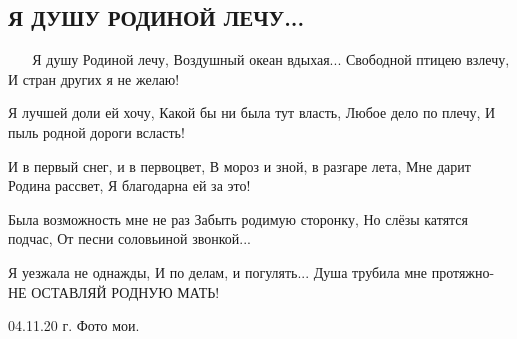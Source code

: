  
 
 

\subsection{Я ДУШУ РОДИНОЙ ЛЕЧУ...}
\label{sec:04_11_2020.fb.taisia_vakulenko.1.rodina}

🍂🌿🍁🌿🍁
Я душу Родиной лечу,
Воздушный океан вдыхая...
Свободной птицею взлечу,
И стран других я не желаю!

Я лучшей доли ей хочу,
Какой бы ни была тут власть,
Любое дело по плечу,
И пыль родной дороги всласть!

И в первый снег, и в первоцвет,
В мороз и зной, в разгаре лета,
Мне дарит Родина рассвет,
Я благодарна ей за это!

Была возможность мне не раз
Забыть родимую сторонку,
Но слёзы катятся подчас,
От песни соловьиной звонкой...

Я уезжала не однажды,
И по делам, и погулять...
Душа трубила мне протяжно-
НЕ ОСТАВЛЯЙ РОДНУЮ МАТЬ!
 
04.11.20 г.
Фото мои.

